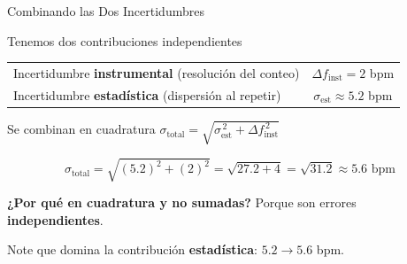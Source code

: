 \documentclass[aspectratio=169,xcolor=dvipsnames]{beamer}
\begin{document}
\begin{frame}{Combinando las Dos Incertidumbres}
	\begin{block}{Tenemos dos contribuciones independientes}
		\centering
		\begin{tabular}{lc}
			Incertidumbre \textbf{instrumental} (resolución del conteo) & $\Delta f_{\text{inst}} = 2$ bpm \\[2pt]
			Incertidumbre \textbf{estadística} (dispersión al repetir) & $\sigma_{\text{est}} \approx 5.2$ bpm \\
		\end{tabular}
	\end{block}

	\vspace{0.3cm}
	\begin{exampleblock}{Se combinan en cuadratura}
		\centering
		\Large $\sigma_{\text{total}} = \sqrt{\sigma_{\text{est}}^{\,2} + \Delta f_{\text{inst}}^{\,2}}$
	\end{exampleblock}

	\vspace{0.2cm}
	\[
		\sigma_{\text{total}} = \sqrt{(5.2)^2 + (2)^2} = \sqrt{27.2 + 4} = \sqrt{31.2} \approx 5.6 \text{ bpm}
	\]

	\vspace{0.2cm}
	\begin{center}
		\small \textbf{¿Por qué en cuadratura y no sumadas?} Porque son errores \textbf{independientes}.

		\vspace{0.1cm}
		\small Note que domina la contribución \textbf{estadística}: $5.2 \rightarrow 5.6$ bpm.
	\end{center}
\end{frame}
\end{document}
